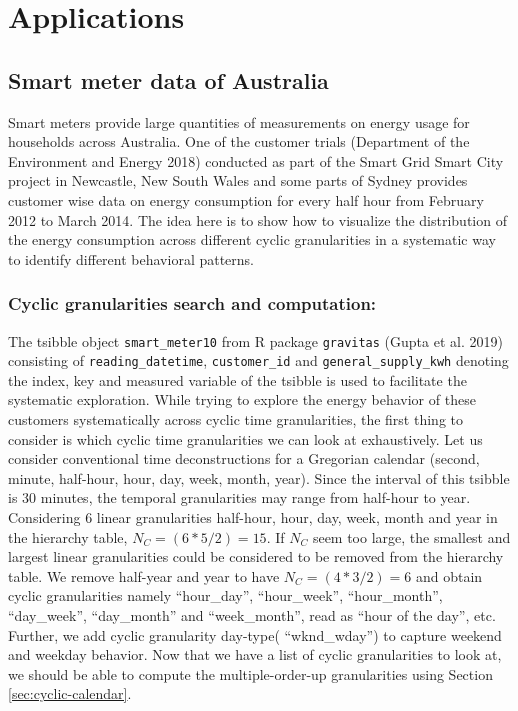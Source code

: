 \documentclass[
]{article}
\begin{document}
\hypertarget{sec:application}{%
\section{Applications}\label{sec:application}}

\hypertarget{sec:smartmeter}{%
\subsection{Smart meter data of Australia}\label{sec:smartmeter}}

Smart meters provide large quantities of measurements on energy usage for households across Australia. One of the customer trials (Department of the Environment and Energy 2018) conducted as part of the Smart Grid Smart City project in Newcastle, New South Wales and some parts of Sydney provides customer wise data on energy consumption for every half hour from February 2012 to March 2014. The idea here is to show how to visualize the distribution of the energy consumption across different cyclic granularities in a systematic way to identify different behavioral patterns.

\hypertarget{cyclic-granularities-search-and-computation}{%
\subsubsection{Cyclic granularities search and computation:}\label{cyclic-granularities-search-and-computation}}

The tsibble object \texttt{smart\_meter10} from R package \texttt{gravitas} (Gupta et al. 2019) consisting of \texttt{reading\_datetime}, \texttt{customer\_id} and \texttt{general\_supply\_kwh} denoting the index, key and measured variable of the tsibble is used to facilitate the systematic exploration. While trying to explore the energy behavior of these customers systematically across cyclic time granularities, the first thing to consider is which cyclic time granularities we can look at exhaustively. Let us consider conventional time deconstructions for a Gregorian calendar (second, minute, half-hour, hour, day, week, month, year). Since the interval of this tsibble is 30 minutes, the temporal granularities may range from half-hour to year. Considering \(6\) linear granularities half-hour, hour, day, week, month and year in the hierarchy table, \(N_C = (6*5/2) = 15\). If \(N_C\) seem too large, the smallest and largest linear granularities could be considered to be removed from the hierarchy table. We remove half-year and year to have \(N_C = (4*3/2) = 6\) and obtain cyclic granularities namely ``hour\_day'', ``hour\_week'', ``hour\_month'', ``day\_week'', ``day\_month'' and ``week\_month'', read as ``hour of the day'', etc. Further, we add cyclic granularity day-type( ``wknd\_wday'') to capture weekend and weekday behavior. Now that we have a list of cyclic granularities to look at, we should be able to compute the multiple-order-up granularities using Section \ref{sec:cyclic-calendar}.
\end{document}
